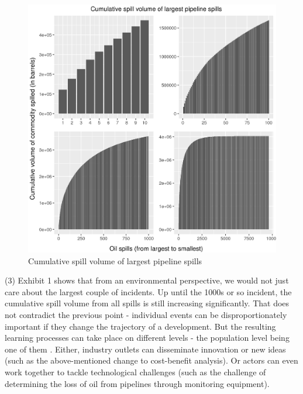 \documentclass[12pt, man, natbib]{apa6}
\begin{document}
	\begin{figure}
	\caption{Cumulative spill volume of largest pipeline spills}
	\includegraphics{figures/cumulative_spill_volume.jpg}
	\end{figure}
	 
	(3) Exhibit 1 shows that from an environmental perspective, we would not just care about the largest couple of incidents. Up until the 1000s or so incident, the cumulative spill volume from all spills is still increasing significantly. That does not contradict the previous point - individual events can be disproportionately important if they change the trajectory of a development. But the resulting learning processes can take place on different levels - the population level being one of them \citep{Miner1995}. Either, industry outlets can disseminate innovation or new ideas (such as the above-mentioned change to cost-benefit analysis). Or actors can even work together to tackle technological challenges (such as the challenge of determining the loss of oil from pipelines through monitoring equipment).	

	

\end{document}
